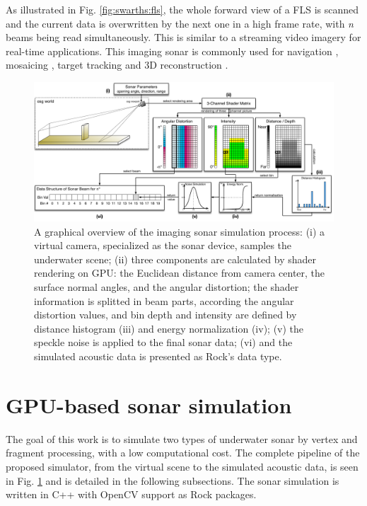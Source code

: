 \documentclass[final,5p,times]{elsarticle}
\begin{document}
As illustrated in Fig. \ref{fig:swarths:fls}, the whole forward view of a
FLS is scanned and the current data is overwritten by the next one in a high
frame rate, with \textit{n} beams being read simultaneously. This is similar
to a streaming video imagery for real-time applications. This imaging sonar
is commonly used for navigation \cite{fallon2013},
mosaicing \cite{hurtos2014}, target tracking \cite{liu2016}
and 3D reconstruction \cite{huang2015a}.


\begin{figure}[t]
    \includegraphics[width=0.85\paperwidth]{figs/sonar_sim}
    \centering
    \captionsetup{justification=centering}
    \caption{A graphical overview of the imaging sonar simulation process:
    (i) a virtual camera, specialized as the sonar device, samples the
    underwater scene; (ii) three components are calculated by shader
    rendering on GPU: the Euclidean distance from camera center, the surface
    normal angles, and the angular distortion; the shader information is
    splitted in beam parts, according the angular distortion values, and
    bin depth and intensity are defined by distance histogram (iii) and energy
    normalization (iv); (v) the speckle noise is applied to the final sonar data;
    (vi) and the simulated acoustic data is presented as Rock's data type.}
    \label{fig:sonar_sim}
\end{figure}



\section{GPU-based sonar simulation}
\label{dev}

The goal of this work is to simulate two types of underwater sonar by vertex
and fragment processing, with a low computational cost. The complete pipeline
of the proposed simulator, from the virtual scene to the simulated acoustic data,
is seen in Fig. \ref{fig:sonar_sim} and is detailed in the following subsections.
The sonar simulation is written in C++ with OpenCV \cite{bradski2000} support as
Rock packages.
\end{document}
